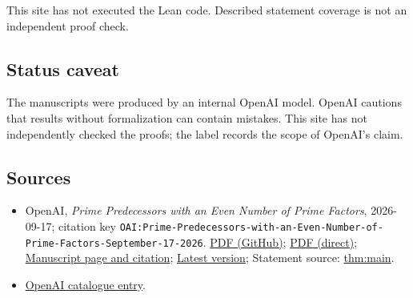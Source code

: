 \documentclass[11pt]{article}
\begin{document}
This site has not executed the Lean code. Described statement coverage is not an independent proof check.

\subsection{Status caveat}
The manuscripts were produced by an internal OpenAI model. OpenAI cautions that results without formalization can contain mistakes. This site has not independently checked the proofs; the label records the scope of OpenAI's claim.

\subsection{Sources}
\begin{itemize}
\item OpenAI, \emph{Prime Predecessors with an Even Number of Prime Factors}, 2026-09-17; citation key \texttt{OAI:Prime-Predecessors-with-an-Even-Number-of-Prime-Factors-September-17-2026}. \href{https://github.com/openai/math/blob/adc7f1241b42e322a6451854ab7e4b4c146bf78a/preprints/Prime-Predecessors-with-an-Even-Number-of-Prime-Factors-September-17-2026/paper.pdf}{PDF (GitHub)}; \href{https://github.com/openai/math/raw/adc7f1241b42e322a6451854ab7e4b4c146bf78a/preprints/Prime-Predecessors-with-an-Even-Number-of-Prime-Factors-September-17-2026/paper.pdf}{PDF (direct)}; \href{https://github.com/openai/math/blob/adc7f1241b42e322a6451854ab7e4b4c146bf78a/preprints/Prime-Predecessors-with-an-Even-Number-of-Prime-Factors-September-17-2026/README.md}{Manuscript page and citation}; \href{https://github.com/openai/math/blob/main/preprints/Prime-Predecessors-with-an-Even-Number-of-Prime-Factors-September-17-2026/paper.pdf}{Latest version}; Statement source: \href{https://github.com/openai/math/blob/adc7f1241b42e322a6451854ab7e4b4c146bf78a/preprints/Prime-Predecessors-with-an-Even-Number-of-Prime-Factors-September-17-2026/build/main.tex\#L53}{thm:main}.
\item \href{https://github.com/openai/math/blob/adc7f1241b42e322a6451854ab7e4b4c146bf78a/CONTENTS.md}{OpenAI catalogue entry}.
\end{itemize}
\end{document}
